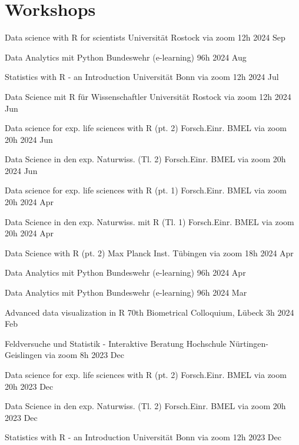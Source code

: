 \documentclass[11pt,a4paper,]{awesome-cv}
\begin{document}
\newpage

\hypertarget{workshops}{%
\section{Workshops}\label{workshops}}

\begin{cvhonors} 
\cvhonor
{Data science with R for scientists  }
{Universität Rostock via zoom}
{12h}
{2024 Sep  }

\cvhonor
{Data Analytics mit Python  }
{Bundeswehr (e-learning)}
{96h}
{2024 Aug  }

\cvhonor
{Statistics with R - an Introduction  }
{Universität Bonn via zoom}
{12h}
{2024 Jul  }

\cvhonor
{Data Science mit R für Wissenschaftler  }
{Universität Rostock via zoom}
{12h}
{2024 Jun  }

\cvhonor
{Data science for exp. life sciences with R (pt. 2)  }
{Forsch.Einr. BMEL via zoom}
{20h}
{2024 Jun  }

\cvhonor
{Data Science in den exp. Naturwiss. (Tl. 2)  }
{Forsch.Einr. BMEL via zoom}
{20h}
{2024 Jun  }

\cvhonor
{Data science for exp. life sciences with R (pt. 1)  }
{Forsch.Einr. BMEL via zoom}
{20h}
{2024 Apr  }

\cvhonor
{Data Science in den exp. Naturwiss. mit R (Tl. 1)  }
{Forsch.Einr. BMEL via zoom}
{20h}
{2024 Apr  }

\cvhonor
{Data Science with R (pt. 2)  }
{Max Planck Inst. Tübingen via zoom}
{18h}
{2024 Apr  }

\cvhonor
{Data Analytics mit Python  }
{Bundeswehr (e-learning)}
{96h}
{2024 Apr  }

\cvhonor
{Data Analytics mit Python  }
{Bundeswehr (e-learning)}
{96h}
{2024 Mar  }

\cvhonor
{Advanced data visualization in R  }
{70th Biometrical Colloquium, Lübeck}
{3h}
{2024 Feb  }

\cvhonor
{Feldversuche und Statistik - Interaktive Beratung  }
{Hochschule Nürtingen-Geislingen via zoom}
{8h}
{2023 Dec  }

\cvhonor
{Data science for exp. life sciences with R (pt. 2)  }
{Forsch.Einr. BMEL via zoom}
{20h}
{2023 Dec  }

\cvhonor
{Data Science in den exp. Naturwiss. (Tl. 2)  }
{Forsch.Einr. BMEL via zoom}
{20h}
{2023 Dec  }

\cvhonor
{Statistics with R - an Introduction  }
{Universität Bonn via zoom}
{12h}
{2023 Dec  }


\end{cvhonors}
\end{document}
